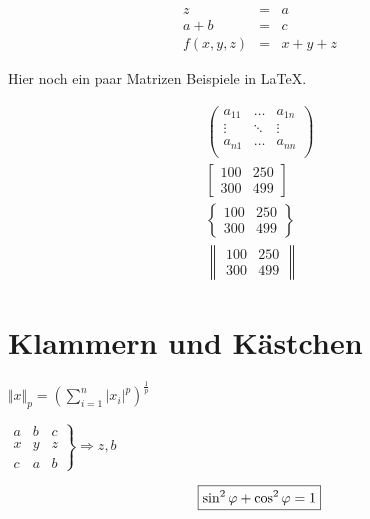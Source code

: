 \begin{equation}
	\begin{array}{lcl}
		z & = & a \\
		a + b & = & c \\
		f(x,y,z) & = & x + y + z
	\end{array}
\end{equation}

Hier noch ein paar Matrizen Beispiele in \LaTeX{}.

\begin{align}
	\begin{pmatrix}
		a_{11}	& \dots   & a_{1n}\\
		\vdots	& \ddots  & \vdots\\
		a_{n1}	& \dots   & a_{nn}\\
	\end{pmatrix}
	\\[0.4cm]
	\begin{bmatrix} 
		100&250\\
		300&499
	\end{bmatrix}
	\\[0.4cm]
	\begin{Bmatrix} 
		100&250\\
		300&499
	\end{Bmatrix}
	\\[0.4cm]
	\begin{Vmatrix}
		100&250\\
		300&499
	\end{Vmatrix}
\end{align}

\section{Klammern und Kästchen}

\begin{center}
	\( \Vert x\Vert_{p}=
	\left(
	\sum_{i=1}^{n} | x_{i} |^{p}
	\right)^{\frac{1}{p}} \)
\end{center}

\begin{center}
	\( \left.
	\begin{array}{lc|r}
		a&b&c\\
		\hline
		x&y&z\\
		c&a&b
	\end{array}
	\right\}
	\Rightarrow z,b \)
\end{center}

\begin{equation*}
\mbox{
	\boxed{
		\sin^2\varphi+\cos^2\varphi=1
	}
}
\end{equation*}

